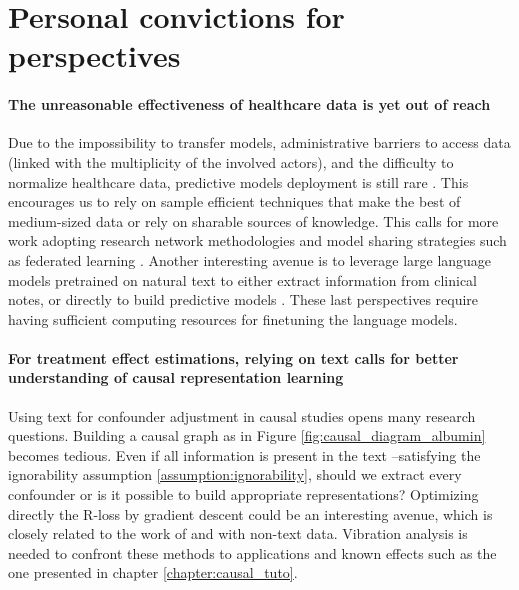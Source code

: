 \documentclass[french,12pt,twoside,a4paper]{book}
\begin{document}
\section{Personal convictions for perspectives}

\paragraph{The unreasonable effectiveness of healthcare data is yet out of
  reach} Due to the impossibility to transfer models, administrative barriers to
access data (linked with the multiplicity of the involved actors), and the
difficulty to normalize healthcare data, predictive models deployment is still
rare \citep{kelly2019key}. This encourages us to rely on sample efficient
techniques that make the best of medium-sized data or rely on sharable sources
of knowledge. This calls for more work adopting research network methodologies
\citep{hripcsak2015observational} and model sharing strategies such as
federated learning \citep{rieke2020future}. Another interesting avenue is to
leverage large language models pretrained on natural text to either extract
information from clinical notes, or directly to build predictive models
\citep{jiang2023health}. These last perspectives require having sufficient
computing resources for finetuning the language models.

\paragraph{For treatment effect estimations, relying on text calls for better
  understanding of causal representation learning}

Using text for confounder adjustment in causal studies opens many research
questions. Building a causal graph as in Figure \ref{fig:causal_diagram_albumin}
becomes tedious. Even if all information is present in the text --satisfying the
ignorability assumption \ref{assumption:ignorability}, should we extract every
confounder or is it possible to build appropriate representations? Optimizing
directly the R-loss by gradient descent could be an interesting avenue, which is
closely related to the work of \cite{johansson2022generalization} and
\cite{chernozhukov2022riesznet} with non-text data. Vibration analysis is needed
to confront these methods to applications and known effects such as the one
presented in chapter \ref{chapter:causal_tuto}.
\end{document}
